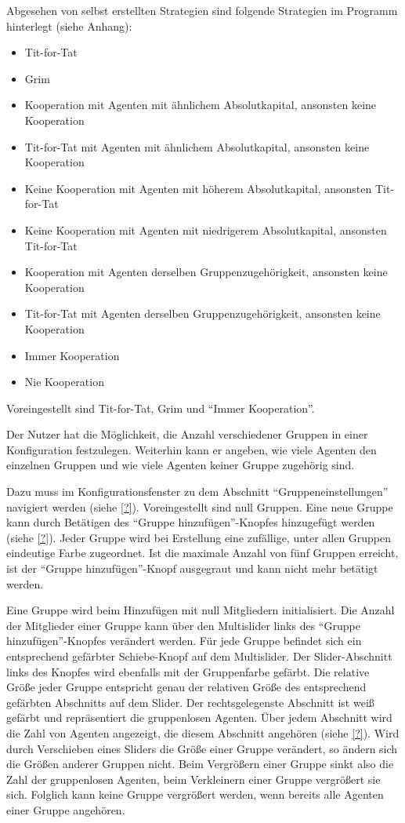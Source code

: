 \documentclass[parskip=full,11pt]{scrartcl}
\begin{document}
Abgesehen von selbst erstellten Strategien sind folgende Strategien im Programm hinterlegt (siehe Anhang):
\begin{itemize} \itemsep -10pt
\item Tit-for-Tat
\item Grim
\item Kooperation mit Agenten mit ähnlichem Absolutkapital, ansonsten keine Kooperation
\item Tit-for-Tat mit Agenten mit ähnlichem Absolutkapital, ansonsten keine Kooperation
\item Keine Kooperation mit Agenten mit höherem Absolutkapital, ansonsten Tit-for-Tat
\item Keine Kooperation mit Agenten mit niedrigerem Absolutkapital, ansonsten Tit-for-Tat
\item Kooperation mit Agenten derselben Gruppenzugehörigkeit, ansonsten keine Kooperation
\item Tit-for-Tat mit Agenten derselben Gruppenzugehörigkeit, ansonsten keine Kooperation
\item Immer Kooperation
\item Nie Kooperation
\end{itemize}
Voreingestellt sind Tit-for-Tat, Grim und \enquote{Immer Kooperation}.

Der Nutzer hat die Möglichkeit, die Anzahl verschiedener Gruppen in einer Konfiguration festzulegen. Weiterhin kann er angeben, wie viele Agenten den einzelnen Gruppen und wie viele Agenten keiner Gruppe zugehörig sind.

Dazu muss im Konfigurationsfenster zu dem Abschnitt \enquote{Gruppeneinstellungen} navigiert werden (siehe \cref{?}). Voreingestellt sind null Gruppen. Eine neue Gruppe kann durch Betätigen des \enquote{Gruppe hinzufügen}-Knopfes hinzugefügt werden (siehe \cref{?}). Jeder Gruppe wird bei Erstellung eine zufällige, unter allen Gruppen eindeutige Farbe zugeordnet. Ist die maximale Anzahl von fünf Gruppen erreicht, ist der \enquote{Gruppe hinzufügen}-Knopf ausgegraut und kann nicht mehr betätigt werden.

Eine Gruppe wird beim Hinzufügen mit null Mitgliedern initialisiert. Die Anzahl der Mitglieder einer Gruppe kann über den Multislider links des \enquote{Gruppe hinzufügen}-Knopfes verändert werden. Für jede Gruppe befindet sich ein entsprechend gefärbter Schiebe-Knopf auf dem Multislider. Der Slider-Abschnitt links des Knopfes wird ebenfalls mit der Gruppenfarbe gefärbt. Die relative Größe jeder Gruppe entspricht genau der relativen Größe des entsprechend gefärbten Abschnitts auf dem Slider. Der rechtsgelegenste Abschnitt ist weiß gefärbt und repräsentiert die gruppenlosen Agenten. Über jedem Abschnitt wird die Zahl von Agenten angezeigt, die diesem Abschnitt angehören (siehe \cref{?}). Wird durch Verschieben eines Sliders die Größe einer Gruppe verändert, so ändern sich die Größen anderer Gruppen nicht. Beim Vergrößern einer Gruppe sinkt also die Zahl der gruppenlosen Agenten, beim Verkleinern einer Gruppe vergrößert sie sich. Folglich kann keine Gruppe vergrößert werden, wenn bereits alle Agenten einer Gruppe angehören.
\end{document}
